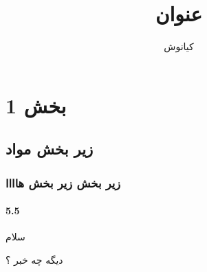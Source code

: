 \documentclass[a4paper,10pt]{article}
\title{عنوان}
\author{کیانوش}
\date{}
\begin{document}
    \maketitle
    \tableofcontents
    \newpage

    \section{بخش 1}

    \subsection{زیر بخش مواد}

    \subsubsection{زیر بخش زیر بخش هاااا}

    \paragraph{5.5}{سلام}

     دیگه چه خبر ؟
     
\end{document}
